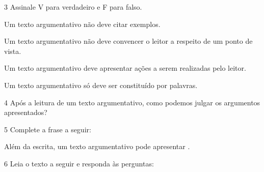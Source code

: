 \num{3} Assinale V para verdadeiro e F para falso.

\begin{boxlist}
\item Um texto argumentativo não deve citar exemplos. 

\item Um texto argumentativo não deve convencer o leitor a respeito de 
um ponto de vista. 

\item Um texto argumentativo deve apresentar ações a serem realizadas pelo leitor.  

\item Um texto argumentativo só deve ser constituído por palavras. 
\end{boxlist}

\num{4} Após a leitura de um texto argumentativo, como podemos julgar os argumentos apresentados?



\num{5} Complete a frase a seguir:

Além da escrita, um texto argumentativo pode apresentar \preencher.


\num{6} Leia o texto a seguir e responda às perguntas:

